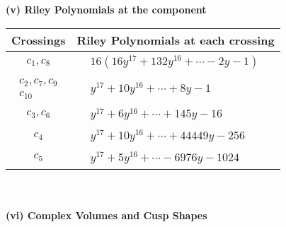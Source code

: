 \documentclass[1p]{elsarticle_modified}
\theoremstyle{definition}
\begin{document}
\flushleft \textbf{(v) Riley Polynomials at the component}\newline \\
\begin{tabular}{m{50pt}|m{274pt}}
Crossings & \hspace{64pt}Riley Polynomials at each crossing \\
\hline $$\begin{aligned}c_{1},c_{8}\end{aligned}$$&$\begin{aligned}
&16(16 y^{17}+132 y^{16}+\cdots-2 y-1)
\end{aligned}$\\
\hline $$\begin{aligned}c_{2},c_{7},c_{9}\\c_{10}\end{aligned}$$&$\begin{aligned}
&y^{17}+10 y^{16}+\cdots+8 y-1
\end{aligned}$\\
\hline $$\begin{aligned}c_{3},c_{6}\end{aligned}$$&$\begin{aligned}
&y^{17}+6 y^{16}+\cdots+145 y-16
\end{aligned}$\\
\hline $$\begin{aligned}c_{4}\end{aligned}$$&$\begin{aligned}
&y^{17}+10 y^{16}+\cdots+44449 y-256
\end{aligned}$\\
\hline $$\begin{aligned}c_{5}\end{aligned}$$&$\begin{aligned}
&y^{17}+5 y^{16}+\cdots-6976 y-1024
\end{aligned}$\\
\hline
\end{tabular}\\~\\
\newpage\flushleft \textbf{(vi) Complex Volumes and Cusp Shapes}
\end{document}
